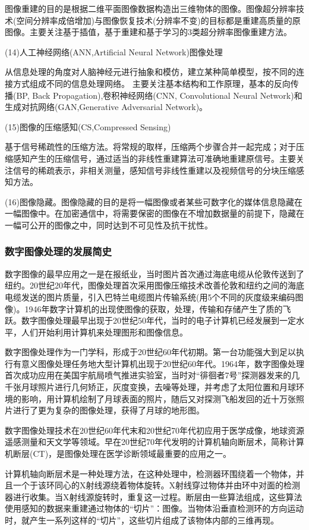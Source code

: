 \documentclass[11pt]{article}
\begin{document}
图像重建的目的是根据二维平面图像数据构造出三维物体的图像。图像超分辨率技术(空间分辨率成倍增加)与图像恢复技术(分辨率不变)的目标都是重建高质量的原图像。主要关注基于插值，基于重建和基于学习的3类超分辨率图像重建方法。

(14)人工神经网络(ANN,Artificial Neural Network)图像处理

从信息处理的角度对人脑神经元进行抽象和模仿，建立某种简单模型，按不同的连接方式组成不同的信息处理网络。
主要关注基本结构和工作原理，基本的反向传播(BP, Back Propagation),卷积神经网络(CNN, Convolutional Neural Network)和生成对抗网络(GAN,Generative Adversarial Network)。

(15)图像的压缩感知(CS,Compressed Sensing)

基于信号稀疏性的压缩方法。将常规的取样，压缩两个步骤合并一起完成；对于压缩感知产生的压缩信号，通过适当的非线性重建算法可准确地重建原信号。主要关注信号的稀疏表示，非相关测量，感知信号非线性重建以及视频信号的分块压缩感知方法。

(16)图像隐藏。图像隐藏的目的是将一幅图像或者某些可数字化的媒体信息隐藏在一幅图像中。在加密通信中，将需要保密的图像在不增加数据量的前提下，隐藏在一幅可公开的图像之中，同时达到不可见性及抗干扰性。
\subsubsection{数字图像处理的发展简史}

数字图像的最早应用之一是在报纸业，当时图片首次通过海底电缆从伦敦传送到了纽约。20世纪20年代，图像处理首次采用图像压缩技术改善伦敦和纽约之间的海底电缆发送的图片质量，引入巴特兰电缆图片传输系统(用5个不同的灰度级来编码图像)。1946年数字计算机的出现使图像的获取，处理，传输和存储产生了质的飞跃。数字图像处理最早出现于20世纪50年代，当时的电子计算机已经发展到一定水平，人们开始利用计算机来处理图形和图像信息。

数字图像处理作为一门学科，形成于20世纪60年代初期。第一台功能强大到足以执行有意义图像处理任务地大型计算机出现于20世纪60年代。1964年，数字图像处理首次成功应用在美国宇航局喷气推进实验室，当时对“徘徊者7号”探测器发来的几千张月球照片进行几何矫正，灰度变换，去噪等处理，并考虑了太阳位置和月球环境的影响，用计算机绘制了月球表面的照片，随后又对探测飞船发回的近十万张照片进行了更为复杂的图像处理，获得了月球的地形图。

数字图像处理技术在20世纪60年代末和20世纪70年代初应用于医学成像，地球资源遥感测量和天文学等领域。早在20世纪70年代发明的计算机轴向断层术，简称计算机断层(CT)，是图像处理在医学诊断领域最重要的应用之一。

计算机轴向断层术是一种处理方法，在这种处理中，检测器环围绕着一个物体，并且一个于该环同心的X射线源绕着物体旋转。X射线穿过物体并由环中对面的检测器进行收集。当X射线源旋转时，重复这一过程。断层由一些算法组成，这些算法使用感知的数据来重建通过物体的“切片”：图像。当物体沿垂直检测环的方向运动时，就产生一系列这样的“切片”，这些切片组成了该物体内部的三维再现。
\end{document}
